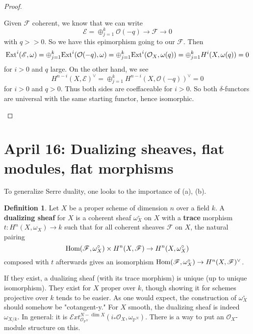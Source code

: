 \documentclass[10pt,reqno]{amsart}
\theoremstyle{definition}
\newtheorem{definition}[theorem]{Definition}
\theoremstyle{remark}
\numberwithin{equation}{section}
\numberwithin{theorem}{section}
\newcommand{\OO}{{\mathcal O}}
\newcommand{\Hom}{\textup{Hom}}
\newcommand{\Ext}{\textup{Ext}}
\newcommand{\scrExt}{\mathscr{E}xt}
\newcommand{\FF}{{\mathscr F}}
\newcommand{\EE}{{\mathscr E}}
\newcommand{\PP}{{\mathbb P}}
\begin{document}
\begin{proof}
\begin{itemize}
Given $\FF$ coherent, we know that we can write 
\[\EE = \oplus_{j=1}^k \OO(-q) \to \FF \to 0\]
with $q >> 0$. So we have this epimorphism going to our $\FF$. Then 
\[\Ext^i(\EE,\omega) = \oplus_{j=1}^k \Ext^i(\OO(-q),\omega) = \oplus_{j=1}^k  \Ext^i(\OO_X,\omega(q)) = \oplus_{j=1}^k  H^i(X, \omega(q)) = 0\]
for $i > 0$ and $q$ large. On the other hand, we see 
\[H^{n-i}(X,\EE)^{\vee} = \oplus_{j=1}^k H^{n-i}(X,\OO(-q))^{\vee} = 0\]
for $i > 0$ and $q > 0$. Thus both sides are coeffaceable for $i > 0$. So both $\delta$-functors are universal with the same starting functor, hence isomorphic.
\end{itemize}
\end{proof}

\section{April 16: Dualizing sheaves, flat modules, flat morphisms}

To generalize Serre duality, one looks to the importance of (a), (b). 

\begin{definition} Let $X$ be a proper scheme of dimension $n$ over a field $k$. A \textbf{dualizing sheaf} for $X$ is a coherent sheaf $\omega_X^{\circ}$ on $X$ with a \textbf{trace} morphism $t: H^n(X,\omega_X) \to k$ such that for all coherent sheaves $\FF$ on $X$, the natural pairing
\[\Hom(\FF,\omega^{\circ}_X) \times H^n(X,\FF) \to H^n(X,\omega^{\circ}_X)\]
composed with $t$ afterwards gives an isomorphism $\Hom(\FF,\omega_X^{\circ}) \to H^n(X,\FF)^{\vee}$.
\end{definition}

If they exist, a dualizing sheaf (with its trace morphism) is unique (up to unique isomorphism). They exist for $X$ proper over $k$, though showing it for schemes projective over $k$ tends to be easier. As one would expect, the construction of $\omega_X^{\circ}$ should somehow be "cotangent-y."  For $X$ smooth, the dualizing sheaf is indeed $\omega_{X/k}$. In general: it is $ \scrExt^{N - \dim X}_{\OO_{\PP^N}}(i_*\OO_X, \omega_{\PP^N})$. There is a way to put an $\OO_X$-module structure on this.
\\
\end{document}
